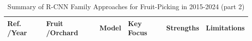\documentclass[a4paper,fleqn]{cas-dc}
\begin{document}
\begin{table}[htbp]
\begin{tabular}{@{}p{}p{}p{}p{}p{}p{}@{}}
		\bottomrule
	\end{tabular}
\end{table}

\begin{table}[htbp]
	\centering
	\footnotesize 
	\addtocounter{table}{-1}
	\caption{Summary of R-CNN Family Approaches for Fruit-Picking in 2015-2024 (part 2)} 
	\begin{tabular}{@{}p{}p{}p{}p{}p{}p{}@{}}
	\toprule
	\textbf{Ref. \newline /Year} & \textbf{Fruit \newline /Orchard} & \textbf{Model} & 			\textbf{Key Focus} & \textbf{Strengths} & \textbf{Limitations} \\ \midrule


\end{tabular}
\end{table}
\end{document}
